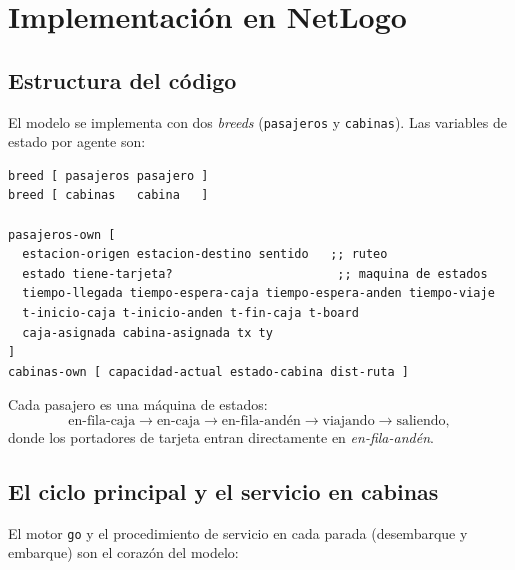\documentclass[11pt,a4paper]{article}
\newcommand{\code}[1]{\texttt{#1}}
\begin{document}
\section{Implementación en NetLogo}
\label{sec:impl}

\subsection{Estructura del código}
El modelo se implementa con dos \emph{breeds} (\code{pasajeros} y \code{cabinas}).
Las variables de estado por agente son:

\begin{lstlisting}
breed [ pasajeros pasajero ]
breed [ cabinas   cabina   ]

pasajeros-own [
  estacion-origen estacion-destino sentido   ;; ruteo
  estado tiene-tarjeta?                       ;; maquina de estados
  tiempo-llegada tiempo-espera-caja tiempo-espera-anden tiempo-viaje
  t-inicio-caja t-inicio-anden t-fin-caja t-board
  caja-asignada cabina-asignada tx ty
]
cabinas-own [ capacidad-actual estado-cabina dist-ruta ]
\end{lstlisting}

\noindent Cada pasajero es una máquina de estados:
\[
\text{en-fila-caja} \to \text{en-caja} \to \text{en-fila-andén}
\to \text{viajando} \to \text{saliendo},
\]
donde los portadores de tarjeta entran directamente en \emph{en-fila-andén}.

\subsection{El ciclo principal y el servicio en cabinas}
El motor \code{go} y el procedimiento de servicio en cada parada (desembarque y
embarque) son el corazón del modelo:
\end{document}
